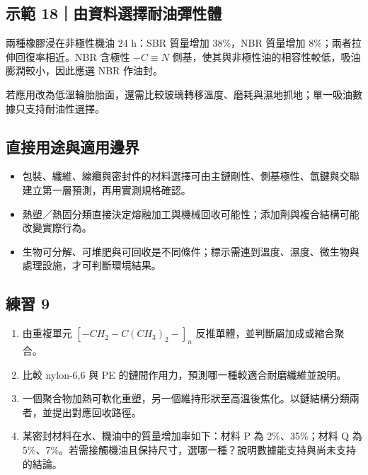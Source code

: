 \documentclass[11pt,a4paper]{article}
\providecommand{\tightlist}{%
  \setlength{\itemsep}{0pt}\setlength{\parskip}{0pt}}
\begin{document}
\begin{HandoutWorkedExample}

\subsection{示範 18｜由資料選擇耐油彈性體}\label{ux793aux7bc4-18ux7531ux8cc7ux6599ux9078ux64c7ux8010ux6cb9ux5f48ux6027ux9ad4}

兩種橡膠浸在非極性機油 24 h：SBR 質量增加 38\%，NBR 質量增加 8\%；兩者拉伸回復率相近。NBR 含極性 \(-C\equiv N\) 側基，使其與非極性油的相容性較低，吸油膨潤較小，因此應選 NBR 作油封。

若應用改為低溫輪胎胎面，還需比較玻璃轉移溫度、磨耗與濕地抓地；單一吸油數據只支持耐油性選擇。

\end{HandoutWorkedExample}

\subsection{直接用途與適用邊界}\label{ux76f4ux63a5ux7528ux9014ux8207ux9069ux7528ux908aux754c-8}

\begin{itemize}
\tightlist
\item
  包裝、纖維、線纜與密封件的材料選擇可由主鏈剛性、側基極性、氫鍵與交聯建立第一層預測，再用實測規格確認。
\item
  熱塑／熱固分類直接決定熔融加工與機械回收可能性；添加劑與複合結構可能改變實際行為。
\item
  生物可分解、可堆肥與可回收是不同條件；標示需連到溫度、濕度、微生物與處理設施，才可判斷環境結果。
\end{itemize}

\subsection{練習 9}\label{ux7df4ux7fd2-9}

\begin{enumerate}
\def\labelenumi{\arabic{enumi}.}
\tightlist
\item
  由重複單元 \([-CH_2-C(CH_3)_2-]_n\) 反推單體，並判斷屬加成或縮合聚合。
\item
  比較 nylon-6,6 與 PE 的鏈間作用力，預測哪一種較適合耐磨纖維並說明。
\item
  一個聚合物加熱可軟化重塑，另一個維持形狀至高溫後焦化。以鏈結構分類兩者，並提出對應回收路徑。
\item
  某密封材料在水、機油中的質量增加率如下：材料 P 為 2\%、35\%；材料 Q 為 5\%、7\%。若需接觸機油且保持尺寸，選哪一種？說明數據能支持與尚未支持的結論。
\end{enumerate}
\end{document}

